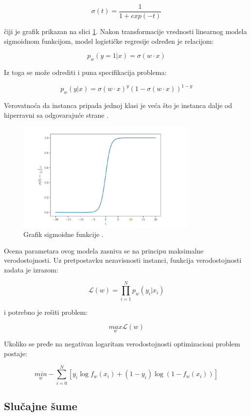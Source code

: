 $$\sigma(t) = \dfrac{1}{1+exp(-t)}$$

čiji je grafik prikazan na slici \ref{fig:sigmoid}. Nakon transformacije vrednosti linearnog modela sigmoidnom funkcijom, model logističke regresije određen je relacijom:

$$p_w(y = 1 | x) = \sigma(w \cdot x)$$


Iz toga se može odrediti i puna specifikacija problema:

$$p_w(y | x) = \sigma(w \cdot x)^y (1 - \sigma(w \cdot x))^{1-y}$$

Verovatnoća da instanca pripada jednoj klasi je veća što je instanca dalje od hiperravni sa odgovarajuće strane \cite{ml}.

\begin{figure}[h]
	\centering
	\includegraphics[width=0.8\textwidth]{Figures/sigmoid.png}
	\caption{Grafik sigmoidne funkcije \cite{ml}.}
	\label{fig:sigmoid}
\end{figure}

Ocena parametara ovog modela zasniva se na principu maksimalne verodostojnosti. Uz pretpostavku nezavisnosti instanci, funkcija verodostojnosti zadata je izrazom:

$$\mathcal{L}(w) = \prod_{i=1}^{N}p_w(y_i|x_i)$$

i potrebno je rešiti problem:

$$\underset{w}{max} \mathcal{L}(w)$$

Ukoliko se pređe na negativan logaritam verodostojnosti optimizacioni problem postaje:

$$ \underset{w}{min} -\sum_{i=0}^{N} [y_i\log f_w(x_i) + (1-y_i)\log(1 - f_w(x_i))]$$



\subsection{Slučajne šume} 

